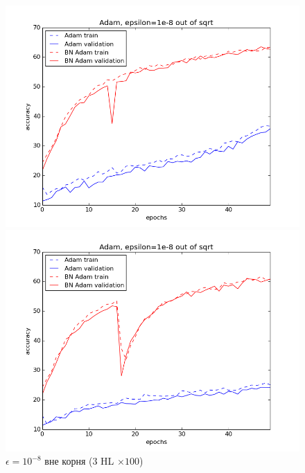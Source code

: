 \documentclass[12pt,oneside]{article}
\begin{document}
\begin{figure}[h!]
\centering
\begin{minipage}{0.45\textwidth}
\includegraphics[scale=0.45]{images/clAdam1.png}
\end{minipage} \hfill
\begin{minipage}{0.45\textwidth}
\includegraphics[scale=0.45]{images/clAdam1_s10.png}
\end{minipage}
\caption{\small $\epsilon = 10^{-8}$ вне корня ($3$ HL $\times 100$)}
\end{figure}

\newpage
\end{document}
